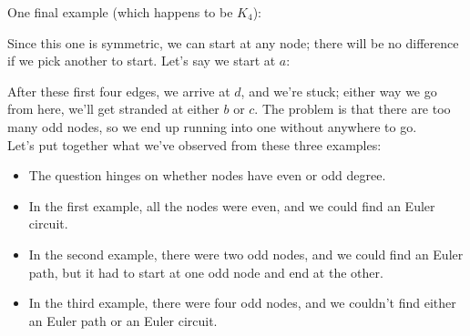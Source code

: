 One final example (which happens to be $K_4$):
\begin{center}
\end{center}

Since this one is symmetric, we can start at any node; there will be no difference if we pick another to start.  Let's say we start at $a$:
\begin{center}
\end{center}

After these first four edges, we arrive at $d$, and we're stuck; either way we go from here, we'll get stranded at either $b$ or $c$.  The problem is that there are too many odd nodes, so we end up running into one without anywhere to go.\\

Let's put together what we've observed from these three examples:
\begin{itemize}
\item The question hinges on whether nodes have even or odd degree.
\item In the first example, all the nodes were even, and we could find an Euler circuit.
\item In the second example, there were two odd nodes, and we could find an Euler path, but it had to start at one odd node and end at the other.
\item In the third example, there were four odd nodes, and we couldn't find either an Euler path or an Euler circuit.
\end{itemize}


